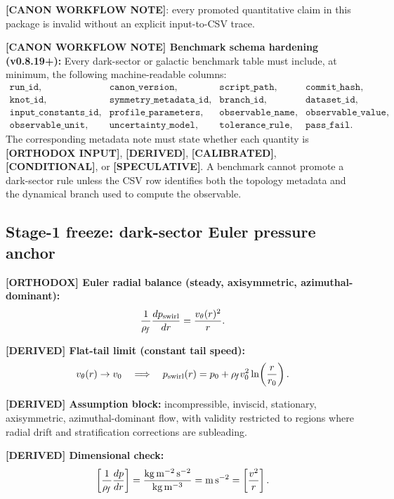 \textbf{[CANON WORKFLOW NOTE]}: every promoted quantitative claim in this package is invalid without an explicit input-to-CSV trace.

\textbf{[CANON WORKFLOW NOTE] Benchmark schema hardening (v0.8.19+):}
Every dark-sector or galactic benchmark table must include, at minimum, the following machine-readable columns:
\[
\begin{array}{llll}
\texttt{run\_id}, & \texttt{canon\_version}, & \texttt{script\_path}, & \texttt{commit\_hash},\\
\texttt{knot\_id}, & \texttt{symmetry\_metadata\_id}, & \texttt{branch\_id}, & \texttt{dataset\_id},\\
\texttt{input\_constants\_id}, & \texttt{profile\_parameters}, & \texttt{observable\_name}, & \texttt{observable\_value},\\
\texttt{observable\_unit}, & \texttt{uncertainty\_model}, & \texttt{tolerance\_rule}, & \texttt{pass\_fail}.
\end{array}
\]
The corresponding metadata note must state whether each quantity is \textbf{[ORTHODOX INPUT]}, \textbf{[DERIVED]}, \textbf{[CALIBRATED]}, \textbf{[CONDITIONAL]}, or \textbf{[SPECULATIVE]}.
A benchmark cannot promote a dark-sector rule unless the CSV row identifies both the topology metadata and the dynamical branch used to compute the observable.

\subsection{Stage-1 freeze: dark-sector Euler pressure anchor}
\textbf{[ORTHODOX] Euler radial balance (steady, axisymmetric, azimuthal-dominant):}
\begin{align}
    \frac{1}{\rho_{\!f}}\frac{dp_{\mathrm{swirl}}}{dr}
    =
    \frac{v_\theta(r)^2}{r}.
    \label{eq:exec_swirl_pressure}
\end{align}

\textbf{[DERIVED] Flat-tail limit (constant tail speed):}
\begin{align}
    v_\theta(r)\to v_0
    \quad\Longrightarrow\quad
    p_{\mathrm{swirl}}(r)
    =
    p_0 + \rho_{\!f} v_0^2\ln\!\left(\frac{r}{r_0}\right).
\end{align}

\textbf{[DERIVED] Assumption block:}
incompressible, inviscid, stationary, axisymmetric, azimuthal-dominant flow, with validity restricted to regions where radial drift and stratification corrections are subleading.

\textbf{[DERIVED] Dimensional check:}
\[
\left[\frac{1}{\rho_{\!f}}\frac{dp}{dr}\right]
=
\frac{\mathrm{kg\,m^{-2}\,s^{-2}}}{\mathrm{kg\,m^{-3}}}
=
\mathrm{m\,s^{-2}}
=
\left[\frac{v^2}{r}\right].
\]

